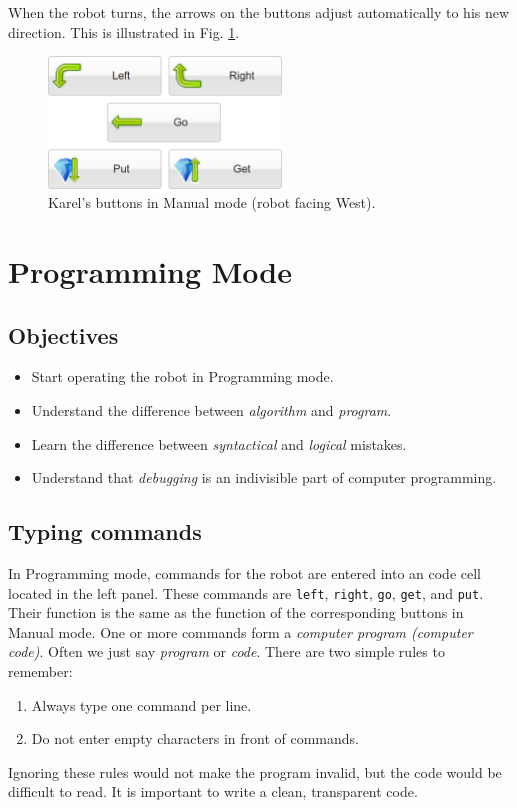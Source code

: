 When the robot turns, the arrows on the buttons adjust automatically to his new 
direction. This is illustrated in Fig. \ref{fig:buttons2}.

\begin{figure}[!ht]
\begin{center}
\includegraphics[width=6.2cm]{imgk/buttons-all-2.png}
\vspace{-0mm}
\caption{Karel's buttons in Manual mode (robot facing West).}
\label{fig:buttons2}
\end{center}
\end{figure}


\section{Programming Mode} \label{sec:bridge}

\subsection{Objectives} 
 
\begin{itemize}
\item Start operating the robot in Programming mode.
\item Understand the difference between {\em algorithm} and {\em program}. 
\item Learn the difference between {\em syntactical} and {\em logical} mistakes.
\item Understand that {\em debugging} is an indivisible part of computer programming.
\end{itemize}

\subsection{Typing commands}
In Programming mode, commands for the robot are entered into an code cell located in the left panel.
These commands are {\tt left}, {\tt right}, {\tt go}, {\tt get}, and {\tt put}.
Their function is the same as the function of the corresponding buttons in Manual mode.
One or more commands form a {\em computer program (computer code)}. Often 
we just say {\em program} or {\em code}.
There are two simple rules to remember:
\begin{enumerate}
\item Always type one command per line.
\item Do not enter empty characters in front of commands. 
\end{enumerate}
Ignoring these rules would not make the program invalid, but the code would be 
difficult to read. It is important to write a clean, transparent code. 

